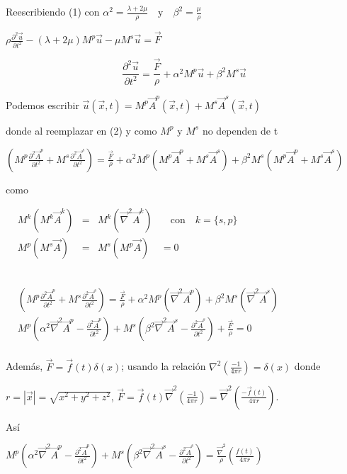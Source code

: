 \documentclass[a4paper,12pt]{article}
\begin{document}
Reescribiendo (1) con $\boxed{\alpha^2=\frac{\lambda+2\mu}{\rho}\quad\text{y}\quad\beta^2=\frac{\mu}{\rho}}$

\begin{center}
$\rho\frac{\partial^2\vec u}{\partial t^2}-(\lambda +2\mu)M^p\vec u-\mu M^s\vec u =\vec F$
\end{center}
\begin{equation}
\frac{\partial^2\vec u}{\partial t^2}=\frac{\vec F}{\rho}+\alpha^2M^p\vec u + \beta^2M^s\vec u
\end{equation}
    

Podemos escribir $\vec u(\vec x,t)=M^p\vec A^p(\vec x,t)+M^s\vec A^s(\vec x,t)$

donde al reemplazar en (2) y como $M^p$ y $M^s$ no dependen de t

$\left(M^p\frac{\partial^2\vec A^p}{\partial t^2}+M^s\frac{\partial^2\vec A^s}{\partial t^2}\right)=\frac{\vec F}{\rho}+\alpha^2M^p(M^p\vec A^p+M^s\vec A^s)+\beta^2M^s(M^p\vec A^p+M^s\vec A^s)$


como

$
\begin{array}{rclclclc}
    &M^k(M^k\vec A^k)&=&M^k(\vec\nabla^2\vec A^k)&\quad\text{con}\quad k=\{s,p\} \\
    & M^p(M^s\vec A)&=&M^s(M^p\vec A)&=0 \\
    &
\end{array}
$

$\quad$

$
\begin{array}{rcl}
    &\left(M^p\frac{\partial^2\vec A^p}{\partial t^2}+M^s\frac{\partial^2\vec A^s}{\partial t^2}\right)=\frac{\vec F}{\rho} +\alpha^2M^p(\vec\nabla^2\vec A^p) +\beta^2M^s(\vec\nabla^2\vec A^s) \\
    & M^p\left(\alpha^2\vec\nabla^2\vec A^p-\frac{\partial^2\vec A^p}{\partial t^2} \right)+M^s\left(\beta^2\vec\nabla^2\vec A^s-\frac{\partial^2\vec A^s}{\partial t^2}\right)+\frac{\vec F}{\rho}=0\\
    &
\end{array}
$

Además, $\vec F=\vec f(t)\delta(x)$; usando la relación $\nabla^2\left(\frac{-1}{4\pi r} \right)=\delta(x)$ donde 

$r=|\vec x|=\sqrt{x^2+y^2+z^2}$, $\vec F=\vec f(t)\vec\nabla^2\left(\frac{-1}{4\pi r} \right)=\vec\nabla^2\left(\frac{-\vec f(t)}{4\pi r}\right)$.

Así

$M^p\left(\alpha^2\vec\nabla^2\vec A^p-\frac{\partial^2\vec A^p}{\partial t^2} \right)+M^s\left(\beta^2\vec\nabla^2\vec A^s-\frac{\partial^2\vec A^s}{\partial t^2}\right)=\frac{\vec\nabla^2}{\rho}\left(\frac{f(t)}{4\pi r}\right)$
\end{document}
